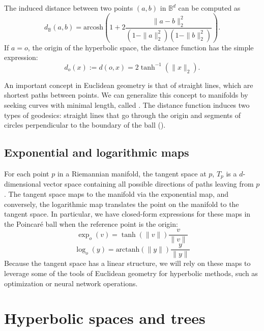 

The induced distance between two points $(a,b)$ in $\mathbb{B}^d$ can be computed as
\begin{equation*}
    d_{\mathbb{B}}(a,b) = \text{arcosh}\left(1 + 2\frac{\|a-b\|^2_2}{(1-\|a\|^2_2)(1-\|b\|^2_2)}\right).
\end{equation*}
If $a = o$, the origin of the hyperbolic space, the distance function has the simple expression:
\begin{equation*}
    d_o(x) := d(o, x) = 2\tanh^{-1}(\|x\|_2).
\end{equation*}


An important concept in Euclidean geometry is that of straight lines, which are shortest paths between points. We can generalize this concept to manifolds by seeking curves with minimal length, called . The distance function induces two types of geodesics: straight lines that go through the origin and segments of circles perpendicular to the boundary of the ball ().

%

\subsection{Exponential and logarithmic maps}
For each point $p$ in a Riemannian manifold, the tangent space at $p$, $T_p$ is a $d$-dimensional vector space containing all possible directions of paths leaving from $p$. The tangent space maps to the manifold via the exponential map, and conversely, the logarithmic map translates the point on the manifold to the tangent space. In particular, we have closed-form expressions for these maps in the Poincaré ball when the reference point is the origin:
\begin{equation*}
    \exp_o(v) = \tanh(\|v\|) \frac{v}{\|v\|}
\end{equation*}
\begin{equation*}
    \log_o(y) = \text{arctanh}(\|y\|) \frac{y}{\|y\|}
\end{equation*}
Because the tangent space has a linear structure, we will rely on these maps to leverage some of the tools of Euclidean geometry for hyperbolic methods, such as optimization or neural network operations.

\section{Hyperbolic spaces and trees}



